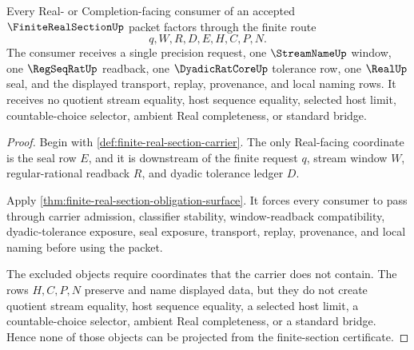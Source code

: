\begin{theorem}
\label{thm:finite-real-section-nonescape}
Every Real- or Completion-facing consumer of an accepted $\FiniteRealSectionUp$ packet factors through the finite route
$$
q,W,R,D,E,H,C,P,N.
$$
The consumer receives a single precision request, one $\StreamNameUp$ window, one $\RegSeqRatUp$ readback, one $\DyadicRatCoreUp$ tolerance row, one $\RealUp$ seal, and the displayed transport, replay, provenance, and local naming rows. It receives no quotient stream equality, host sequence equality, selected host limit, countable-choice selector, ambient Real completeness, or standard bridge.
\end{theorem}
\begin{proof}
Begin with \autoref{def:finite-real-section-carrier}. The only Real-facing coordinate is the seal row $E$, and it is downstream of the finite request $q$, stream window $W$, regular-rational readback $R$, and dyadic tolerance ledger $D$.

Apply \autoref{thm:finite-real-section-obligation-surface}. It forces every consumer to pass through carrier admission, classifier stability, window-readback compatibility, dyadic-tolerance exposure, seal exposure, transport, replay, provenance, and local naming before using the packet.

The excluded objects require coordinates that the carrier does not contain. The rows $H,C,P,N$ preserve and name displayed data, but they do not create quotient stream equality, host sequence equality, a selected host limit, a countable-choice selector, ambient Real completeness, or a standard bridge. Hence none of those objects can be projected from the finite-section certificate.
\end{proof}

